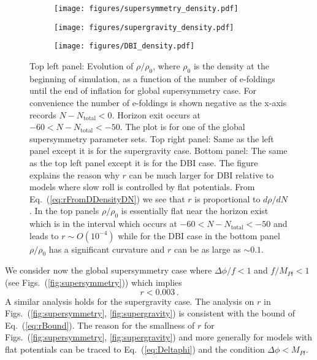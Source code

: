 \documentclass[12pt]{article}
\begin{document}
\begin{figure}
  \centering
  \begin{subfigure}{0.45 \textwidth}
    \texttt{[image: figures/supersymmetry\_density.pdf]}
  \end{subfigure}
  \begin{subfigure}{0.45 \textwidth}
    \texttt{[image: figures/supergravity\_density.pdf]}
  \end{subfigure}
  \begin{subfigure}{0.45 \textwidth}
    \texttt{[image: figures/DBI\_density.pdf]}
  \end{subfigure}
  \caption{
    Top left panel: Evolution of $\rho / \rho_0$, where $\rho_0$ is the density at the beginning of simulation, as a function of the number of e-foldings until the end of inflation for global supersymmetry case.
    For convenience the number of e-foldings is shown negative as the x-axis records $N - N_\text{total} < 0$.
    Horizon exit occurs at $-60 < N - N_\text{total} < -50$.
    The plot is for one of the global supersymmetry parameter sets.
    Top right panel: Same as the left panel except it is for the supergravity case.
    Bottom panel: The same as the top left panel except it is for the DBI case.
    The figure explains the reason why $r$ can be much larger for DBI relative to models where slow roll is controlled by flat potentials.
    From Eq.~(\ref{eq:rFromDDensityDN}) we see that $r$ is proportional to $d\rho / dN$.
    In the top panels $\rho / \rho_0$ is essentially flat near the horizon exist which is in the interval which occurs at $-60 < N - N_\text{total} < -50$ and leads to $r \sim O\left(10^{-4}\right)$ while for the DBI case in the bottom panel $\rho / \rho_0$ has a significant curvature and $r$ can be as large as $\sim 0.1$.
  } \label{fig:density}
\end{figure}
We consider now the global supersymmetry case where $\Delta\phi / f < 1$ and $f / M_{Pl} < 1$ (see Figs.~(\ref{fig:supersymmetry})) which implies
\begin{equation} \label{eq:rBound}
  r < 0.003\,.
\end{equation}
A similar analysis holds for the supergravity case.
The analysis on $r$ in Figs.~(\ref{fig:supersymmetry}, \ref{fig:supergravity}) is consistent with the bound of Eq.~(\ref{eq:rBound}).
The reason for the smallness of $r$ for Figs.~(\ref{fig:supersymmetry}, \ref{fig:supergravity}) and more generally for models with flat potentials can be traced to Eq.~(\ref{eq:Deltaphi}) and the condition $\Delta\phi < M_{Pl}$.
\end{document}
